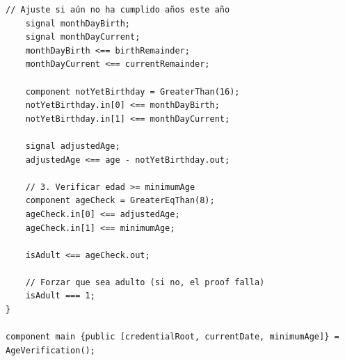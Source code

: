 \documentclass[11pt,a4paper,twoside]{book}
\theoremstyle{definition}
\theoremstyle{remark}
\begin{document}
\begin{lstlisting}[language=circom, caption={Circuito para age verification con ZK}]
    // Ajuste si aún no ha cumplido años este año
    signal monthDayBirth;
    signal monthDayCurrent;
    monthDayBirth <== birthRemainder;
    monthDayCurrent <== currentRemainder;
    
    component notYetBirthday = GreaterThan(16);
    notYetBirthday.in[0] <== monthDayBirth;
    notYetBirthday.in[1] <== monthDayCurrent;
    
    signal adjustedAge;
    adjustedAge <== age - notYetBirthday.out;
    
    // 3. Verificar edad >= minimumAge
    component ageCheck = GreaterEqThan(8);
    ageCheck.in[0] <== adjustedAge;
    ageCheck.in[1] <== minimumAge;
    
    isAdult <== ageCheck.out;
    
    // Forzar que sea adulto (si no, el proof falla)
    isAdult === 1;
}

component main {public [credentialRoot, currentDate, minimumAge]} = AgeVerification();
\end{lstlisting}
\end{document}
